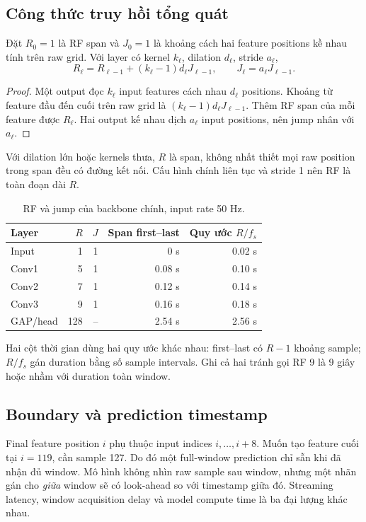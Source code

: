 \documentclass[11pt,a4paper]{article}
\theoremstyle{definition}
\begin{document}
\subsection{Công thức truy hồi tổng quát}
Đặt $R_0=1$ là RF span và $J_0=1$ là khoảng cách hai feature positions
kề nhau tính trên raw grid. Với layer có kernel $k_\ell$, dilation
$d_\ell$, stride $a_\ell$,
\begin{equation}
R_\ell=R_{\ell-1}+(k_\ell-1)d_\ell J_{\ell-1},\qquad
J_\ell=a_\ell J_{\ell-1}.
\label{eq:rf}
\end{equation}
\begin{proof}
Một output đọc $k_\ell$ input features cách nhau $d_\ell$ positions.
Khoảng từ feature đầu đến cuối trên raw grid là
$(k_\ell-1)d_\ell J_{\ell-1}$. Thêm RF span của mỗi feature được
$R_\ell$. Hai output kế nhau dịch $a_\ell$ input positions, nên jump
nhân với $a_\ell$.
\end{proof}
Với dilation lớn hoặc kernels thưa, $R$ là span, không nhất thiết mọi
raw position trong span đều có đường kết nối. Cấu hình chính liên tục
và stride 1 nên RF là toàn đoạn dài $R$.

\begin{table}[!htbp]\centering\small
\caption{RF và jump của backbone chính, input rate 50 Hz.}
\begin{tabularx}{\linewidth}{@{}Yrrrr@{}}\toprule
Layer & $R$ & $J$ & Span first--last & Quy ước $R/f_s$\\\midrule
Input &1&1&0 s&0.02 s\\
Conv1 &5&1&0.08 s&0.10 s\\
Conv2 &7&1&0.12 s&0.14 s\\
Conv3 &9&1&0.16 s&0.18 s\\
GAP/head &128&--&2.54 s&2.56 s\\\bottomrule
\end{tabularx}
\end{table}
Hai cột thời gian dùng hai quy ước khác nhau: first--last có $R-1$
khoảng sample; $R/f_s$ gán duration bằng số sample intervals. Ghi cả hai
tránh gọi RF 9 là 9 giây hoặc nhầm với duration toàn window.

\subsection{Boundary và prediction timestamp}
Final feature position $i$ phụ thuộc input indices $i,\ldots,i+8$.
Muốn tạo feature cuối tại $i=119$, cần sample 127. Do đó một full-window
prediction chỉ sẵn khi đã nhận đủ window. Mô hình không nhìn raw sample
sau window, nhưng một nhãn gán cho \emph{giữa} window sẽ có look-ahead
so với timestamp giữa đó. Streaming latency, window acquisition delay
và model compute time là ba đại lượng khác nhau.
\end{document}
